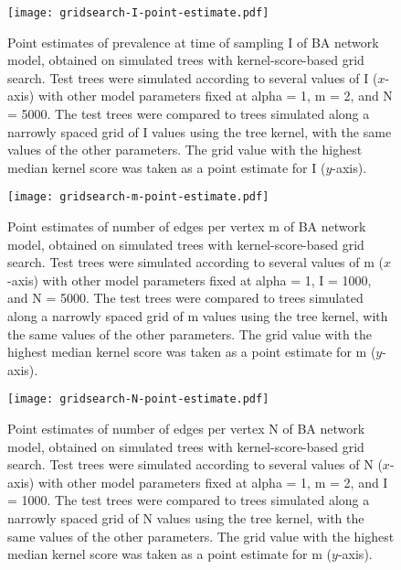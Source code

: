 \begin{figure}[ht]
    \centering
    \texttt{[image: gridsearch-I-point-estimate.pdf]}
    \caption[ 
        Point estimates of prevalence at time of sampling \gls{I} of
        \gls{BA} network model, obtained on simulated trees with
        kernel-score-based grid search.
    ]{
        Point estimates of prevalence at time of sampling \gls{I} of
        \gls{BA} network model, obtained on simulated trees with
        kernel-score-based grid search. Test trees were simulated according to
        several values of \gls{I} ($x$-axis) with other model parameters fixed
        at \gls{alpha} = 1, \gls{m} = 2, and \gls{N} = 5000. The test trees
        were compared to trees simulated along a narrowly spaced grid of
        \gls{I} values using the tree kernel, with the same values of the other
        parameters. The grid value with the highest median kernel score was
        taken as a point estimate for \gls{I} ($y$-axis).
    }
    \label{fig:gridptI}
\end{figure}

\begin{figure}[ht]
    \centering
    \texttt{[image: gridsearch-m-point-estimate.pdf]}
    \caption[
        Point estimates of number of edges per vertex \gls{m} of \gls{BA}
        network model, obtained on simulated trees with kernel-score-based grid
        search.
    ]{
        Point estimates of number of edges per vertex \gls{m} of \gls{BA}
        network model, obtained on simulated trees with kernel-score-based grid
        search. Test trees were simulated according to several values of
        \gls{m} ($x$-axis) with other model parameters fixed at \gls{alpha} =
        1, \gls{I} = 1000, and \gls{N} = 5000. The test trees were compared to
        trees simulated along a narrowly spaced grid of \gls{m} values using
        the tree kernel, with the same values of the other parameters. The grid
        value with the highest median kernel score was taken as a point
        estimate for \gls{m} ($y$-axis).
    }
    \label{fig:gridptm}
\end{figure}

\begin{figure}[ht]
    \centering
    \texttt{[image: gridsearch-N-point-estimate.pdf]}
    \caption[
        Point estimates of number of edges per vertex \gls{N} of \gls{BA}
        network model, obtained on simulated trees with kernel-score-based grid
        search.
    ]{
        Point estimates of number of edges per vertex \gls{N} of \gls{BA}
        network model, obtained on simulated trees with kernel-score-based grid
        search. Test trees were simulated according to several values of
        \gls{N} ($x$-axis) with other model parameters fixed at \gls{alpha} =
        1, \gls{m} = 2, and \gls{I} = 1000. The test trees were compared to
        trees simulated along a narrowly spaced grid of \gls{N} values using
        the tree kernel, with the same values of the other parameters. The grid
        value with the highest median kernel score was taken as a point
        estimate for \gls{m} ($y$-axis).
    }
    \label{fig:gridptN}
\end{figure}


